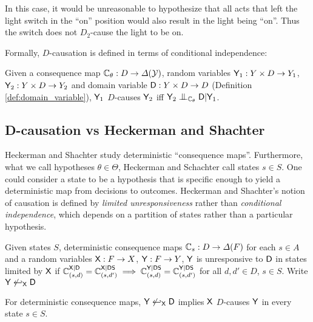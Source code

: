 In this case, it would be unreasonable to hypothesize that all acts that left the light switch in the ``on'' position would also result in the light being ``on''. Thus the switch does not $D_2$-cause the light to be on.

Formally, $D$-causation is defined in terms of conditional independence:

\begin{definition}[$D$-causation]\label{def:d_cause}
Given a consequence map $\mathbb{C}_\theta:D\to \Delta(\mathcal{Y})$, random variables $\mathsf{Y}_1:Y\times D\to Y_1$, $\mathsf{Y}_2:Y\times D\to Y_2$ and domain variable $\mathsf{D}:Y\times D\to D$ (Definition \ref{def:domain_variable}), $\mathsf{Y}_1$ $D$-causes $\mathsf{Y}_2$ iff $\RV{Y}_2\CI_{\kernel{C}_\theta} \RV{D}|\RV{Y}_1$.
\end{definition}

\subsection{D-causation vs Heckerman and Shachter}

Heckerman and Shachter study deterministic ``consequence maps''. Furthermore, what we call hypotheses $\theta\in\Theta$, Heckerman and Schachter call states $s\in S$. One could consider a state to be a hypothesis that is specific enough to yield a deterministic map from decisions to outcomes. Heckerman and Shachter's notion of causation is defined by \emph{limited unresponsiveness} rather than \emph{conditional independence}, which depends on a partition of states rather than a particular hypothesis.

\begin{definition}
    Given states $S$, deterministic consequence maps $\mathbb{C}_s:D\to \Delta(F)$ for each $s\in A$ and a random variables $\mathsf{X}:F\to X$, $\mathsf{Y}:F\to Y$, $\mathsf{Y}$ is unresponsive to $\mathsf{D}$ in states limited by $\mathsf{X}$ if $\mathbb{C}_{(s,d)}^{\mathsf{X}|\mathsf{D}}=\mathbb{C}_{(s,d')}^{\mathsf{X}|\mathsf{D}\mathsf{S}}\implies \mathbb{C}_{(s,d)}^{\mathsf{Y}|\mathsf{D}\mathsf{S}}=\mathbb{C}_{(s,d')}^{\mathsf{Y}|\mathsf{D}\mathsf{S}}$ for all $d,d'\in D$, $s\in S$. Write $\mathsf{Y}\not\hookleftarrow_{\mathsf{X}} \mathsf{D}$
\end{definition}

\begin{lemma}
For deterministic consequence maps, $\mathsf{Y}\not\hookleftarrow_{\mathsf{X}} \mathsf{D} $ implies $\mathsf{X}$ $D$-causes $\mathsf{Y}$ in every state $s\in S$.
\end{lemma}

